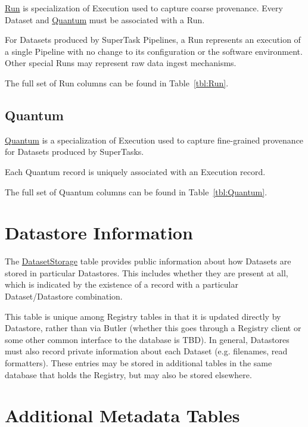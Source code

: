 \documentclass[DM,toc]{lsstdoc}
\newcommand{\tblref}[1]{\hyperref[tbl:#1]{#1}}
\newcommand{\coltable}[1]{
    \begin{table}[htb]
        {
            \footnotesize
            
        }
        \caption{#1 Columns}
        \label{tbl:#1}
    \end{table}
}
\begin{document}
\tblref{Run} is specialization of Execution used to capture coarse provenance.
Every Dataset and \hyperref[sec:quantum]{Quantum} must be associated with a Run.

For Datasets produced by SuperTask Pipelines, a Run represents an execution of a single Pipeline with no change to its configuration or the software environment.
Other special Runs may represent raw data ingest mechanisms.

The full set of Run columns can be found in Table~\ref{tbl:Run}.

\coltable{Run}

\subsection{Quantum}
\label{sec:quantum}

\tblref{Quantum} is a specialization of Execution used to capture fine-grained provenance for Datasets produced by SuperTasks.

Each Quantum record is uniquely associated with an Execution record.

The full set of Quantum columns can be found in Table~\ref{tbl:Quantum}.

\coltable{Quantum}

\section{Datastore Information}
\label{sec:datastore-information}

The \tblref{DatasetStorage} table provides public information about how Datasets are stored in particular Datastores.  This includes whether they are present at all, which is indicated by the existence of a record with a particular Dataset/Datastore combination.

\coltable{DatasetStorage}

This table is unique among Registry tables in that it is updated directly by Datastore, rather than via Butler (whether this goes through a Registry client or some other common interface to the database is TBD).
In general, Datastores must also record private information about each Dataset (e.g. filenames, read formatters).
These entries may be stored in additional tables in the same database that holds the Registry, but may also be stored elsewhere.

\section{Additional Metadata Tables}
\label{sec:metadata}
\end{document}

